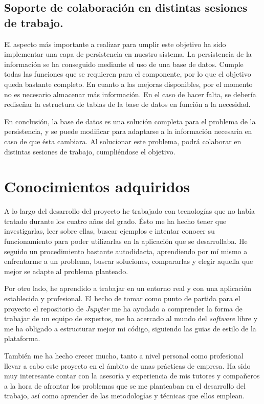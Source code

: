 \documentclass[11pt,spanish,listoffigures]{tfgetsinf}
\begin{document}
\subsection{Soporte de colaboración en distintas sesiones de trabajo.}
\label{subsec:objetivos-conc-persistir}

El aspecto más importante a realizar para umplir este objetivo ha sido implementar una capa de persistencia en nuestro sistema. La persistencia de la información se ha conseguido mediante el uso de una base de datos. Cumple todas las funciones que se requieren para el componente, por lo que el objetivo queda bastante completo. En cuanto a las mejoras disponibles, por el momento no es necesario almacenar más información. En el caso de hacer falta, se debería rediseñar la estructura de tablas de la base de datos en función a la necesidad. 

En conclusión, la base de datos es una solución completa para el problema de la persistencia, y se puede modificar para adaptarse a la información necesaria en caso de que ésta cambiara. Al solucionar este problema, podrá colaborar en distintas sesiones de trabajo, cumpliéndose el objetivo.
 

\section{Conocimientos adquiridos}
\label{sec:conocimientos-adquiridos}

A lo largo del desarrollo del proyecto he trabajado con tecnologías que no había tratado durante los cuatro años del grado. Ésto me ha hecho tener que investigarlas, leer sobre ellas, buscar ejemplos e intentar conocer su funcionamiento para poder utilizarlas en la aplicación que se desarrollaba. He seguido un procedimiento bastante autodidacta, aprendiendo por mí mismo a enfrentarme a un problema, buscar soluciones, compararlas y elegir aquella que mejor se adapte al problema planteado.

Por otro lado, he aprendido a trabajar en un entorno real y con una aplicación establecida y profesional. El hecho de tomar como punto de partida para el proyecto el repositorio de \textit{Jupyter} me ha ayudado a comprender la forma de trabajar de un equipo de expertos, me ha acercado al mundo del \textit{software} libre y me ha obligado a estructurar mejor mi código, siguiendo las guias de estilo de la plataforma. 

También me ha hecho crecer mucho, tanto a nivel personal como profesional llevar a cabo este proyecto en el ámbito de unas prácticas de empresa. Ha sido muy interesante contar con la asesoría y experiencia de mis tutores y compañeros a la hora de afrontar los problemas que se me planteaban en el desarrollo del trabajo, así como aprender de las metodologías y técnicas que ellos emplean. 
\end{document}
